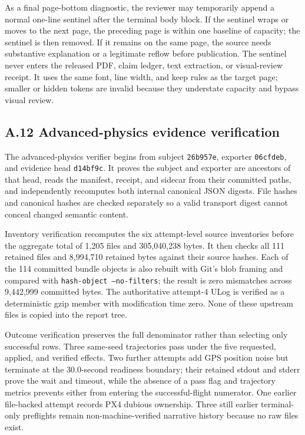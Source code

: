 As a final page-bottom diagnostic, the reviewer may temporarily append a
normal one-line sentinel after the terminal body block. If the sentinel
wraps or moves to the next page, the preceding page is within one
baseline of capacity; the sentinel is then removed. If it remains on the
same page, the source needs substantive explanation or a legitimate
reflow before publication. The sentinel never enters the released PDF,
claim ledger, text extraction, or visual-review receipt. It uses the same
font, line width, and keep rules as the target page; smaller or hidden
tokens are invalid because they understate capacity and bypass visual
review.

\subsection{\texorpdfstring{\textbf{A.12 Advanced-physics evidence
verification}}{A.12 Advanced-physics evidence verification}}\label{a.12-advanced-physics-evidence-verification}

The advanced-physics verifier begins from subject \texttt{26b957e},
exporter \texttt{06cfdeb}, and evidence head \texttt{d14bf9c}. It proves the subject
and exporter are ancestors of that head, reads the manifest, receipt, and
sidecar from their committed paths, and independently recomputes both
internal canonical JSON digests. File hashes and canonical hashes are
checked separately so a valid transport digest cannot conceal changed
semantic content.

Inventory verification recomputes the six attempt-level source inventories
before the aggregate total of 1,205 files and 305,040,238 bytes. It then
checks all 111 retained files and 8,994,710 retained bytes against their
source hashes. Each of the 114 committed bundle objects is also rebuilt
with Git's blob framing and compared with
\texttt{hash-object --no-filters}; the result is zero mismatches across
9,442,999 committed bytes. The authoritative attempt-4 ULog is verified
as a deterministic gzip member with modification time zero. None of these
upstream files is copied into the report tree.

Outcome verification preserves the full denominator rather than selecting
only successful rows. Three same-seed trajectories pass under the five
requested, applied, and verified effects. Two further attempts add GPS
position noise but terminate at the 30.0-second readiness boundary; their
retained stdout and stderr prove the wait and timeout, while the absence
of a pass flag and trajectory metrics prevents either from entering the
successful-flight numerator. One earlier file-backed attempt records PX4
dubious ownership. Three still earlier terminal-only preflights remain
non-machine-verified narrative history because no raw files exist.

